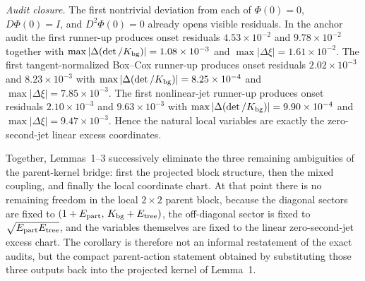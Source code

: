 \documentclass[aps,prd,onecolumn,notitlepage,nofootinbib,superscriptaddress,11pt,floatfix]{revtex4-2}
\begin{document}
\emph{Audit closure.}
The first nontrivial deviation from each of \(\Phi(0)=0\), \(D\Phi(0)=I\), and \(D^2\Phi(0)=0\) already opens visible residuals. In the anchor audit the first runner-up produces onset residuals \(4.53\times10^{-2}\) and \(9.78\times10^{-2}\) together with \(\max|\Delta(\det/K_{\rm bg})|=1.08\times10^{-3}\) and \(\max|\Delta \xi|=1.61\times10^{-2}\). The first tangent-normalized Box--Cox runner-up produces onset residuals \(2.02\times10^{-3}\) and \(8.23\times10^{-3}\) with \(\max|\Delta(\det/K_{\rm bg})|=8.25\times10^{-4}\) and \(\max|\Delta \xi|=7.85\times10^{-3}\). The first nonlinear-jet runner-up produces onset residuals \(2.10\times10^{-3}\) and \(9.63\times10^{-3}\) with \(\max|\Delta(\det/K_{\rm bg})|=9.90\times10^{-4}\) and \(\max|\Delta \xi|=9.47\times10^{-3}\). Hence the natural local variables are exactly the zero-second-jet linear excess coordinates.

Together, Lemmas~1--3 successively eliminate the three remaining ambiguities of the parent-kernel bridge: first the projected block structure, then the mixed coupling, and finally the local coordinate chart. At that point there is no remaining freedom in the local \(2\times2\) parent block, because the diagonal sectors are fixed to \((1+E_{\rm part},\,K_{\rm bg}+E_{\rm tree})\), the off-diagonal sector is fixed to \(\sqrt{E_{\rm part}E_{\rm tree}}\), and the variables themselves are fixed to the linear zero-second-jet excess chart. The corollary is therefore not an informal restatement of the exact audits, but the compact parent-action statement obtained by substituting those three outputs back into the projected kernel of Lemma~1.
\end{document}
